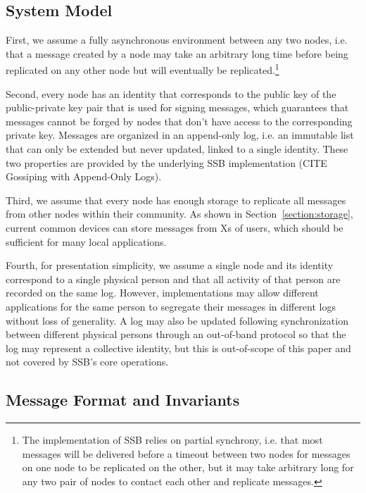 \documentclass[sigplan,screen,10pt]{acmart}
\begin{document}
\subsection{System Model}

First, we assume a fully asynchronous environment between any two nodes, i.e. that a message created by a node may take an arbitrary long time before being replicated on any other node but will eventually be replicated.\footnote{The implementation of SSB relies on partial synchrony, i.e. that most messages will be delivered before a timeout between two nodes for messages on one node to be replicated on the other, but it may take arbitrary long for any two pair of nodes to contact each other and replicate messages.}

Second, every node has an identity that corresponds to the public key of the public-private key pair that is used for signing messages, which guarantees that messages cannot be forged by nodes that don't have access to the corresponding private key. Messages are organized in an append-only log, i.e. an immutable list that can only be extended but never updated, linked to a single identity. These two properties are provided by the underlying SSB implementation (CITE Gossiping with Append-Only Logs).

Third, we assume that every node has enough storage to replicate all messages from other nodes within their community. As shown in Section~\ref{section:storage}, current common devices can store messages from Xs of users, which should be sufficient for many local applications.

Fourth, for presentation simplicity, we assume a single node and its identity correspond to a single physical person and that all activity of that person are recorded on the same log. However, implementations may allow different applications for the same person to segregate their messages in different logs without loss of generality. A log may also be updated following synchronization between different physical persons through an out-of-band protocol so that the log may represent a collective identity,  but this is out-of-scope of this paper and not covered by SSB's core operations.

\subsection{Message Format and Invariants}
\end{document}
